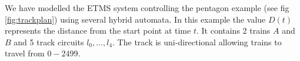 \begin{comment}



\def\r{3} 
\def\sone{ \sin 32}
\def\stwo{\sin 72}
\def\cone{\cos 32}
\def\ctwo{\cos 72}
\coordinate(top) at (0,\r);
\coordinate(topleft) at ({ \r * -cos (36)},{ \r * -sin (36)});
\coordinate(topright) at ({ \r * cos (72)}, { \r * -sin (72)});
\coordinate(botleft) at ({ \r * - cos (36)},{ \r * sin (36)});
\coordinate(botright) at ({\r * sin (72)},{\r * cos (72)});

\tikzstyle{box1}=[circle, draw, text width = 2cm, font=\scriptsize]
\tikzstyle{box3}=[rectangle, draw, text width = 2cm, font=\scriptsize]
\tikzstyle{arrow}=[->, thick]
\tikzstyle{biarrow}=[<->,very thick,shorten >=7pt,shorten <=7pt]


\node (A) [font = \scriptsize]  at (topleft)                  {D =1500 };

\node (B) [font = \scriptsize]    at (botleft)          {D = 0};

\node (C)[font = \scriptsize] at (top)  { D = 1000
						};

\node (D)[font = \scriptsize] at (botright)  { D = 500
						};

\node (E) [font = \scriptsize] at (topright) {D = 2000};

\draw [arrow] (D) -- node[right] {$t_1$} (E);
\draw [arrow] (A) -- node[below = 10pt] {$t_4$} (B);
\draw [arrow] (B) --  node[above = 10pt] {$t_2$} (C);
\draw [arrow] (C) -- node [left] {$t_3$} (D);
\end{comment}
We have modelled the ETMS system controlling the pentagon example (see fig \ref{fig:trackplan}) using several hybrid automata. In this example the value $D(t)$ represents the distance from the start point at time $t$. 
It contains 2 trains $A$ and $B$ and 5 track circuits $l_0, \ldots , l_4$. The track is uni-directional allowing trains to travel from $0 - 2499$. 



